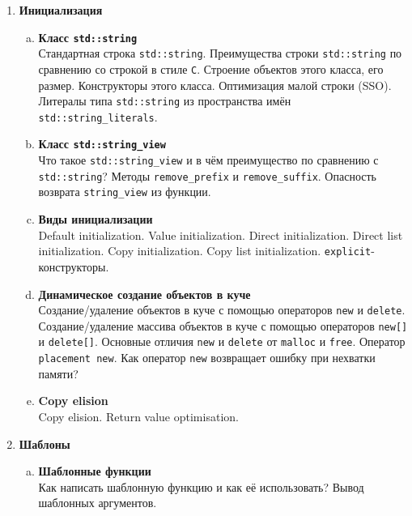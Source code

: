 \documentclass{article}
\begin{document}
\begin{enumerate}
\item \textbf{Инициализация}

\begin{enumerate}[a.]
\item \textbf{Класс \texttt{std::string}}\\
Стандартная строка \texttt{std::string}. Преимущества строки \texttt{std::string} по сравнению со строкой в стиле \texttt{C}. Строение объектов этого класса, его размер. Конструкторы этого класса. Оптимизация малой строки (SSO).
Литералы типа \texttt{std::string} из пространства имён \texttt{std::string\_literals}.

\item \textbf{Класс \texttt{std::string\_view}}\\
Что такое \texttt{std::string\_view} и в чём преимущество по сравнению с \texttt{std::string}? Методы \texttt{remove\_prefix} и \texttt{remove\_suffix}. Опасность возврата \texttt{string\_view} из функции.

\item \textbf{Виды инициализации}\\
Default initialization. Value initialization. Direct initialization. Direct list initialization. Copy initialization. Copy list initialization. \texttt{explicit}-конструкторы.

\item \textbf{Динамическое создание объектов в куче}\\
Создание/удаление объектов в куче с помощью операторов \texttt{new} и \texttt{delete}. Создание/удаление массива объектов в куче с помощью операторов \texttt{new[]} и \texttt{delete[]}. Основные отличия \texttt{new} и \texttt{delete} от \texttt{malloc} и \texttt{free}. Оператор \texttt{placement new}. Как оператор \texttt{new} возвращает ошибку при нехватки памяти?

\item \textbf{Copy elision}\\
Copy elision. Return value optimisation.

\end{enumerate}





\item \textbf{Шаблоны}

\begin{enumerate}[a.]
\item \textbf{Шаблонные функции}\\
Как написать шаблонную функцию и как её использовать? Вывод шаблонных аргументов.


\end{enumerate}
\end{enumerate}
\end{document}
